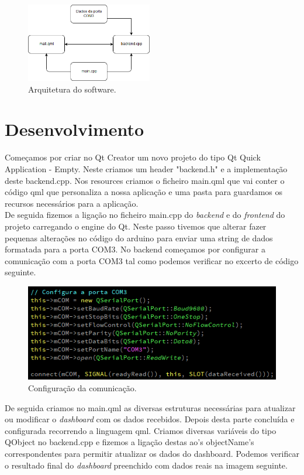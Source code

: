 \documentclass[11pt]{report}
\begin{document}
\begin{figure} [!h]
\centering
\includegraphics[width=55mm]{Prints/arquitectura2soft.png}
\caption{Arquitetura do software.}
\end{figure}


\clearpage


\section*{Desenvolvimento}

Começamos por criar no Qt Creator um novo projeto do tipo Qt Quick Application - Empty. Neste criamos um header "backend.h" e a implementação deste backend.cpp. Nos resources criamos o ficheiro main.qml que vai conter o código qml que personaliza a nossa aplicação e uma pasta para guardamos os recursos necessários para a aplicação. \\

De seguida fizemos a ligação no ficheiro main.cpp do \textit{backend} e do \textit{frontend} do projeto carregando o engine do Qt. Neste passo tivemos que alterar fazer pequenas alterações no código do arduino para enviar uma string de dados formatada para a porta COM3. No backend começamos por configurar a comunicação com a porta COM3 tal como podemos verificar no excerto de código seguinte.

\begin{figure} [!h]
\centering
\includegraphics[width=\textwidth]{Prints/com.png}
\caption{Configuração da comunicação.}
\end{figure}

De seguida criamos no main.qml as diversas estruturas necessárias para atualizar ou modificar o \textit{dashboard} com os dados recebidos. Depois desta parte concluída e configurada recorrendo a linguagem qml. Criamos diversas variáveis do tipo QObject no backend.cpp e fizemos a ligação destas ao's objectName's correspondentes para permitir atualizar os dados do dashboard. Podemos verificar o resultado final do \textit{dashboard} preenchido com dados reais na imagem seguinte.
\end{document}
